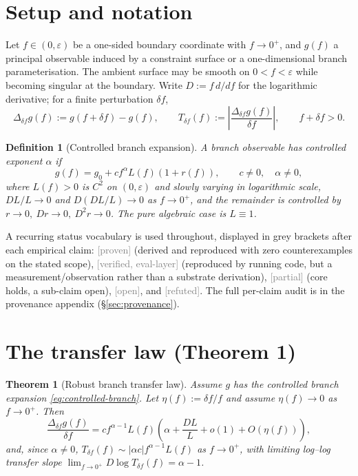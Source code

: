 \documentclass[11pt,a4paper]{article}
\newtheorem{theorem}{Theorem}
\newtheorem{definition}{Definition}
\newcommand{\status}[1]{\textcolor{gray}{\small\textsf{[#1]}}}
\begin{document}
\tableofcontents

\section{Setup and notation}\label{sec:setup}

Let $f\in(0,\varepsilon)$ be a one-sided boundary coordinate with $f\to0^+$, and $g(f)$ a principal observable induced by a constraint surface or a one-dimensional branch parameterisation. The ambient surface may be smooth on $0<f<\varepsilon$ while becoming singular at the boundary. Write $D:=f\,d/df$ for the logarithmic derivative; for a finite perturbation $\delta f$,
\[
    \Delta_{\delta f}g(f):=g(f+\delta f)-g(f),
    \qquad
    T_{\delta f}(f):=\left|\frac{\Delta_{\delta f}g(f)}{\delta f}\right|,
    \qquad f+\delta f>0.
\]

\begin{definition}[Controlled branch expansion]\label{def:controlled-branch}
A branch observable has controlled exponent $\alpha$ if
\begin{equation}\label{eq:controlled-branch}
    g(f)=g_0+c f^{\alpha}L(f)(1+r(f)),
    \qquad c\ne0,\quad \alpha\ne0,
\end{equation}
where $L(f)>0$ is $C^2$ on $(0,\varepsilon)$ and slowly varying in logarithmic scale, $DL/L\to0$ and $D(DL/L)\to0$ as $f\to0^+$, and the remainder is controlled by $r\to0,\ Dr\to0,\ D^2r\to0$. The pure algebraic case is $L\equiv1$.
\end{definition}

A recurring status vocabulary is used throughout, displayed in grey brackets after each empirical claim: \status{proven} (derived and reproduced with zero counterexamples on the stated scope), \status{verified, eval-layer} (reproduced by running code, but a measurement/observation rather than a substrate derivation), \status{partial} (core holds, a sub-claim open), \status{open}, and \status{refuted}. The full per-claim audit is in the provenance appendix (\S\ref{sec:provenance}).

\section{The transfer law (Theorem 1)}\label{sec:transfer}

\begin{theorem}[Robust branch transfer law]\label{thm:robust-transfer}
Assume $g$ has the controlled branch expansion \eqref{eq:controlled-branch}. Let $\eta(f):=\delta f/f$ and assume $\eta(f)\to0$ as $f\to0^+$. Then
\begin{equation}\label{eq:finite-difference-transfer}
    \frac{\Delta_{\delta f}g(f)}{\delta f}
    =c f^{\alpha-1}L(f)\left(\alpha+\frac{DL}{L}+o(1)+O(\eta(f))\right),
\end{equation}
and, since $\alpha\ne0$, $T_{\delta f}(f)\sim|\alpha c| f^{\alpha-1}L(f)$ as $f\to0^+$, with limiting log--log transfer slope $\lim_{f\to0^+}D\log T_{\delta f}(f)=\alpha-1$.
\end{theorem}
\end{document}
